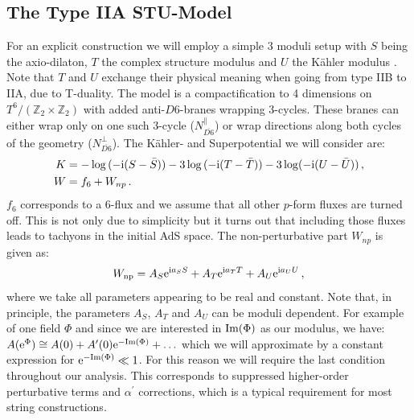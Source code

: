 \documentclass[a4paper,12pt]{report}
\newcommand{\be}{\begin{equation}}
\newcommand{\ee}{\end{equation}}
\newcommand{\bea}{\begin{equation}\begin{aligned}}
\newcommand{\eea}{\end{aligned}\end{equation}}
\def\rmi{{\rm i}}
\def\rme{{\rm e}}
\def\rmim{{\rm Im}}
\begin{document}
\subsection{The Type IIA STU-Model}
\label{sec:antibraneupSTU}
For an explicit construction we will employ a simple 3 moduli setup with $S$ being the axio-dilaton, $T$ the complex structure modulus and $U$ the Kähler modulus \cite{Dibitetto:2011gm,Danielsson:2013rza}. Note that $T$ and $U$ exchange their physical meaning when going from type IIB to IIA, due to T-duality. %
The model is a compactification to 4 dimensions on $T^6/(\mathbb{Z}_2 \times \mathbb{Z}_2)$ with added anti-$D6$-branes wrapping 3-cycles. These branes can either wrap only on one such 3-cycle ($N_{\overline{D6}}^\parallel$) or wrap directions along both cycles of the geometry ($N_{\overline{D6}}^\perp$). The Kähler- and Superpotential we will consider are:
\bea
K &= -\log{(-\rmi (S- \bar{S}))} - 3\log{(-\rmi (T- \bar{T}))} - 3\log(-\rmi (U- \bar{U}))\,,\\
W &= f_6 + W_{np}\,.
\eea
$f_6$ corresponds to a 6-flux and we assume that all other $p$-form fluxes are turned off. This is not only due to simplicity but it turns out that including those fluxes leads to tachyons in the initial AdS space. The non-perturbative part $W_{np}$ is given as:
\be 
W_{\text{np}} = A_S \rme^{\rmi a_S S} + A_T \rme^{\rmi a_T T} + A_U \rme^{\rmi a_U U}\,,
\label{eq:Wnonpert}
\ee
where we take all parameters appearing to be real and constant. Note that, in principle, the parameters $A_S$, $A_T$ and $A_U$ can be moduli dependent. For example of one field $\Phi$ and since we are interested in $\rmim(\Phi)$ as our modulus, we have: $A(\rme^\Phi) \cong A(0) + A^\prime (0) \rme^{-\rmim (\Phi)} + \ldots$ which we will approximate by a constant expression for $\rme^{-\rmim ( \Phi)}\ll 1$. For this reason we will require the last condition throughout our analysis. This corresponds to suppressed higher-order perturbative terms and $\alpha^\prime$ corrections, which is a typical requirement for most string constructions. \\
\end{document}
